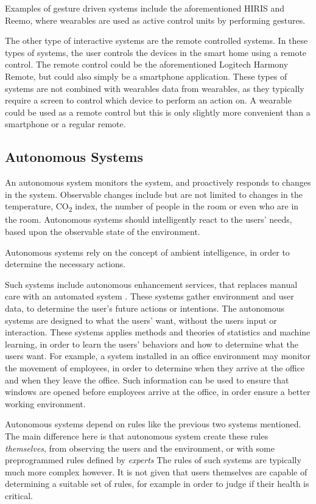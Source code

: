 Examples of gesture driven systems include the aforementioned HIRIS and Reemo, 
where wearables are used as active control units by performing gestures. 

The other type of interactive systems are the remote controlled systems. 
In these types of systems, the user controls the devices in the smart home using a remote control. 
The remote control could be the aforementioned Logitech Harmony Remote, 
but could also simply be a smartphone application. 
These types of systems are not combined with wearables data from wearables, 
as they typically require a screen to control which device to perform an action on.
A wearable could be used as a remote control but this is only slightly more convenient than a smartphone or a regular remote.

\subsection{Autonomous Systems}

An autonomous system monitors the system, 
and proactively responds to changes in the system. 
Observable changes include but are not limited to changes in the temperature, 
CO\textsubscript{2} index, the number of people in the room or even who are in the room.
Autonomous systems should intelligently react to the users' needs, 
based upon the observable state of the environment.

Autonomous systems rely on the concept of ambient intelligence, 
in order to determine the necessary actions.

Such systems include autonomous enhancement services, 
that replaces manual care with an automated system \cite{nehmer2006living}. 
These systems gather environment and user data, 
to determine the user's future actions or intentions. 
The autonomous systems are designed to what the users' want, 
without the users input or interaction. 
These systems applies methods and theories of statistics and machine learning, 
in order to learn the users' behaviors and how to determine what the users want. 
For example, a system installed in an office environment may monitor the movement of employees, 
in order to determine when they arrive at the office and when they leave the office. 
Such information can be used to ensure that windows are opened before employees arrive at the office, 
in order ensure a better working environment.

Autonomous systems depend on rules like the previous two systems mentioned. 
The main difference here is that autonomous system create these rules \emph{themselves}, 
from observing the users and the environment, 
or with some preprogrammed rules defined by \emph{experts}
The rules of such systems are typically much more complex however. 
It is not given that users themselves are capable of determining a suitable set of rules, 
for example in order to judge if their health is critical. 

